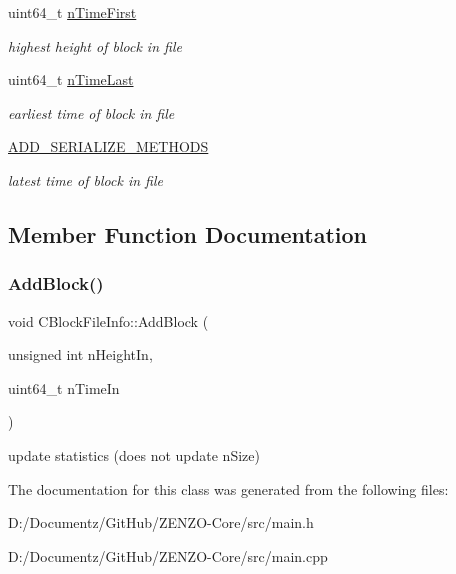 \begin{DoxyCompactItemize}
uint64\+\_\+t \mbox{\hyperlink{class_c_block_file_info_a0e928257d1f003ede485ce49e8cf9189}{n\+Time\+First}}
\begin{DoxyCompactList}\small\item\em highest height of block in file \end{DoxyCompactList}\item 
\mbox{\label{class_c_block_file_info_a1d12e4202474bb2f299d18d7d1f28c78}} 
uint64\+\_\+t \mbox{\hyperlink{class_c_block_file_info_a1d12e4202474bb2f299d18d7d1f28c78}{n\+Time\+Last}}
\begin{DoxyCompactList}\small\item\em earliest time of block in file \end{DoxyCompactList}\item 
\mbox{\label{class_c_block_file_info_ab4daf4df00f90dee15e3a7d2cdb7a273}} 
\mbox{\hyperlink{class_c_block_file_info_ab4daf4df00f90dee15e3a7d2cdb7a273}{A\+D\+D\+\_\+\+S\+E\+R\+I\+A\+L\+I\+Z\+E\+\_\+\+M\+E\+T\+H\+O\+DS}}
\begin{DoxyCompactList}\small\item\em latest time of block in file \end{DoxyCompactList}\end{DoxyCompactItemize}


\subsection{Member Function Documentation}
\mbox{\label{class_c_block_file_info_a66867569ffe06068b8c6eb1139934fbf}} 
\subsubsection{\texorpdfstring{AddBlock()}{AddBlock()}}
{\footnotesize\ttfamily void C\+Block\+File\+Info\+::\+Add\+Block (\begin{DoxyParamCaption}\item[{unsigned int}]{n\+Height\+In,  }\item[{uint64\+\_\+t}]{n\+Time\+In }\end{DoxyParamCaption})\hspace{0.3cm}{\ttfamily [inline]}}

update statistics (does not update n\+Size) 

The documentation for this class was generated from the following files\+:\begin{DoxyCompactItemize}
\item 
D\+:/\+Documentz/\+Git\+Hub/\+Z\+E\+N\+Z\+O-\/\+Core/src/main.\+h\item 
D\+:/\+Documentz/\+Git\+Hub/\+Z\+E\+N\+Z\+O-\/\+Core/src/main.\+cpp\end{DoxyCompactItemize}
